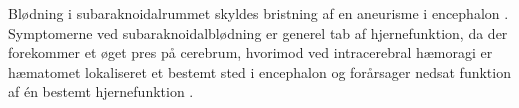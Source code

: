 Blødning i subaraknoidalrummet skyldes bristning af en aneurisme i encephalon \cite{Schulze2011}. Symptomerne ved subaraknoidalblødning er generel tab af hjernefunktion, da der forekommer et øget pres på cerebrum, hvorimod ved intracerebral hæmoragi er hæmatomet lokaliseret et bestemt sted i encephalon og forårsager nedsat funktion af én bestemt hjernefunktion \cite{Caplan2006}. 

